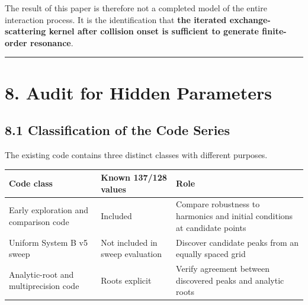 \documentclass[
  10pt,
  a4paper,
]{article}
\newcounter{none} %
\begin{document}
The result of this paper is therefore not a completed model of the
entire interaction process. It is the identification that \textbf{the
iterated exchange-scattering kernel after collision onset is sufficient
to generate finite-order resonance}.

\begin{center}\rule{0.5\linewidth}{0.5pt}\end{center}

\section{8. Audit for Hidden
Parameters}\label{audit-for-hidden-parameters}

\subsection{8.1 Classification of the Code
Series}\label{classification-of-the-code-series}

The existing code contains three distinct classes with different
purposes.

{\def\LTcaptype{none} %
\begin{longtable}[]{@{}
  >{\raggedright\arraybackslash}p{}
  >{\raggedright\arraybackslash}p{}
  >{\raggedright\arraybackslash}p{}@{}}
\toprule\noalign{}
\begin{minipage}[b]{\linewidth}\raggedright
Code class
\end{minipage} & \begin{minipage}[b]{\linewidth}\raggedright
Known 137/128 values
\end{minipage} & \begin{minipage}[b]{\linewidth}\raggedright
Role
\end{minipage} \\
\midrule\noalign{}
\endhead
\bottomrule\noalign{}
\endlastfoot
Early exploration and comparison code & Included & Compare robustness to
harmonics and initial conditions at candidate points \\
Uniform System B v5 sweep & Not included in sweep evaluation & Discover
candidate peaks from an equally spaced grid \\
Analytic-root and multiprecision code & Roots explicit & Verify
agreement between discovered peaks and analytic roots \\
\end{longtable}
}
\end{document}

